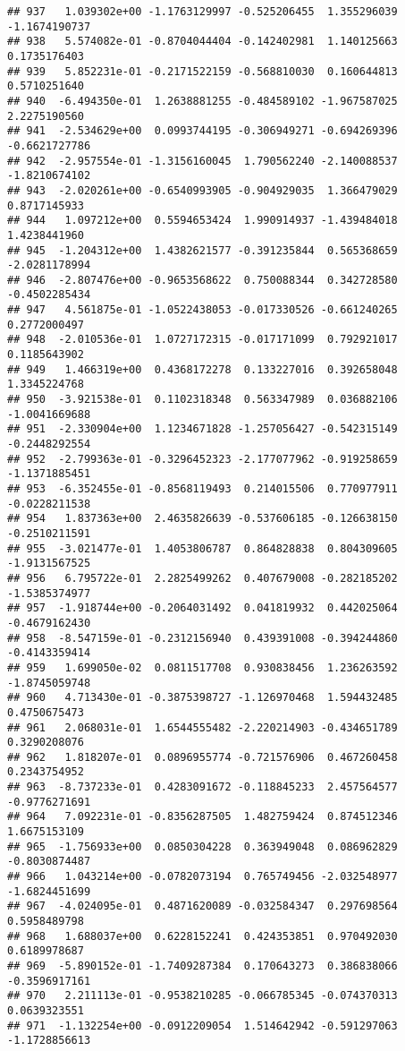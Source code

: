 \documentclass[
]{article}
\begin{document}
\begin{verbatim}
## 937   1.039302e+00 -1.1763129997 -0.525206455  1.355296039 -1.1674190737
## 938   5.574082e-01 -0.8704044404 -0.142402981  1.140125663  0.1735176403
## 939   5.852231e-01 -0.2171522159 -0.568810030  0.160644813  0.5710251640
## 940  -6.494350e-01  1.2638881255 -0.484589102 -1.967587025  2.2275190560
## 941  -2.534629e+00  0.0993744195 -0.306949271 -0.694269396 -0.6621727786
## 942  -2.957554e-01 -1.3156160045  1.790562240 -2.140088537 -1.8210674102
## 943  -2.020261e+00 -0.6540993905 -0.904929035  1.366479029  0.8717145933
## 944   1.097212e+00  0.5594653424  1.990914937 -1.439484018  1.4238441960
## 945  -1.204312e+00  1.4382621577 -0.391235844  0.565368659 -2.0281178994
## 946  -2.807476e+00 -0.9653568622  0.750088344  0.342728580 -0.4502285434
## 947   4.561875e-01 -1.0522438053 -0.017330526 -0.661240265  0.2772000497
## 948  -2.010536e-01  1.0727172315 -0.017171099  0.792921017  0.1185643902
## 949   1.466319e+00  0.4368172278  0.133227016  0.392658048  1.3345224768
## 950  -3.921538e-01  0.1102318348  0.563347989  0.036882106 -1.0041669688
## 951  -2.330904e+00  1.1234671828 -1.257056427 -0.542315149 -0.2448292554
## 952  -2.799363e-01 -0.3296452323 -2.177077962 -0.919258659 -1.1371885451
## 953  -6.352455e-01 -0.8568119493  0.214015506  0.770977911 -0.0228211538
## 954   1.837363e+00  2.4635826639 -0.537606185 -0.126638150 -0.2510211591
## 955  -3.021477e-01  1.4053806787  0.864828838  0.804309605 -1.9131567525
## 956   6.795722e-01  2.2825499262  0.407679008 -0.282185202 -1.5385374977
## 957  -1.918744e+00 -0.2064031492  0.041819932  0.442025064 -0.4679162430
## 958  -8.547159e-01 -0.2312156940  0.439391008 -0.394244860 -0.4143359414
## 959   1.699050e-02  0.0811517708  0.930838456  1.236263592 -1.8745059748
## 960   4.713430e-01 -0.3875398727 -1.126970468  1.594432485  0.4750675473
## 961   2.068031e-01  1.6544555482 -2.220214903 -0.434651789  0.3290208076
## 962   1.818207e-01  0.0896955774 -0.721576906  0.467260458  0.2343754952
## 963  -8.737233e-01  0.4283091672 -0.118845233  2.457564577 -0.9776271691
## 964   7.092231e-01 -0.8356287505  1.482759424  0.874512346  1.6675153109
## 965  -1.756933e+00  0.0850304228  0.363949048  0.086962829 -0.8030874487
## 966   1.043214e+00 -0.0782073194  0.765749456 -2.032548977 -1.6824451699
## 967  -4.024095e-01  0.4871620089 -0.032584347  0.297698564  0.5958489798
## 968   1.688037e+00  0.6228152241  0.424353851  0.970492030  0.6189978687
## 969  -5.890152e-01 -1.7409287384  0.170643273  0.386838066 -0.3596917161
## 970   2.211113e-01 -0.9538210285 -0.066785345 -0.074370313  0.0639323551
## 971  -1.132254e+00 -0.0912209054  1.514642942 -0.591297063 -1.1728856613

\end{verbatim}
\end{document}

